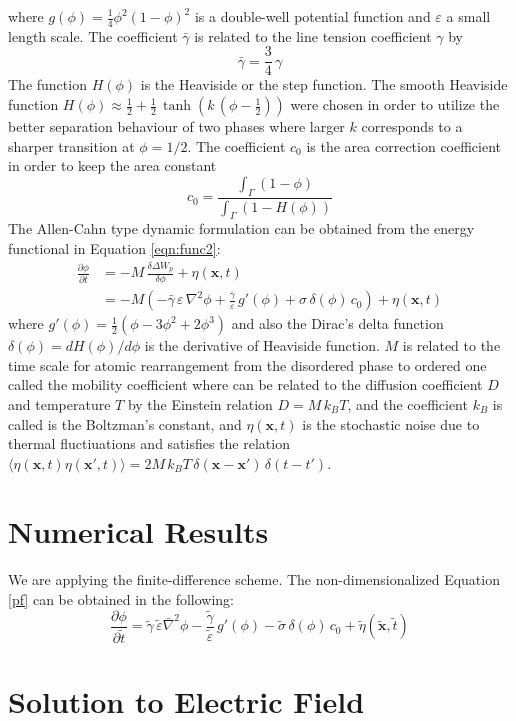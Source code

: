 \documentclass[english,12pt]{article}
\begin{document}
where $g(\phi)=\frac{1}{4}\phi^2(1-\phi)^2$ is a double-well potential function and $\varepsilon$ a small length scale. The coefficient $\bar{\gamma}$ is related to the line tension coefficient $\gamma$ by
\begin{equation}
	\bar{\gamma}=\frac{3}{4}\,\gamma
	\label{eqn:tensioncoeff}
\end{equation}
The function $H(\phi)$ is the Heaviside or the step function. The smooth Heaviside function $H(\phi)\approx\frac{1}{2}+\frac{1}{2}\,\tanh\left(k\,(\phi-\frac{1}{2})\right)$ were chosen in order to utilize the better separation behaviour of two phases where larger $k$ corresponds to a sharper transition at $\phi=1/2$. The coefficient $c_0$ is the area correction coefficient in order to keep the area constant
\begin{equation}
	c_0=\frac{\int_\Gamma(1-\phi)}{\int_{\Gamma}\left(1-H(\phi)\right)}
\end{equation}
The Allen-Cahn type dynamic formulation can be obtained from the energy functional in Equation \ref{eqn:func2}:
\begin{align}
		\frac{\partial\phi}{\partial t}&=-M\,\frac{\delta\Delta W_p}{\delta\phi}+\eta(\mathbf{x},t) \nonumber \\
		&=-M\left(-\bar{\gamma}\,\varepsilon\,\nabla^2\phi+\frac{\bar{\gamma}}{\varepsilon}\,g'(\phi)  + \sigma\,\delta(\phi)\,c_0\right)+\eta(\mathbf{x},t)
		\label{pf}
\end{align}
where $g'(\phi)=\frac{1}{2}\left(\phi-3\phi^2+2\phi^3\right)$ and also the Dirac's delta function $\delta(\phi)=dH(\phi)/d\phi$ is the derivative of Heaviside function. $M$ is related to the time scale for atomic rearrangement from the disordered phase to ordered one called the mobility coefficient where can be related to the diffusion coefficient $D$ and temperature $T$ by the Einstein relation $D=M\,k_B T$, and the coefficient $k_B$ is called is the Boltzman's constant, and $\eta(\mathbf{x},t)$ is the stochastic noise due to thermal fluctiuations and satisfies the relation $\langle\eta(\mathbf{x},t)\eta(\mathbf{x'},t)\rangle=2M\,k_B T\,\delta(\mathbf{x}-\mathbf{x'})\,\delta(t-t')$.
\section{Numerical Results}
We are applying the finite-difference scheme. The non-dimensionalized Equation \ref{pf} can be obtained in the following:
\begin{equation}
	\frac{\partial\phi}{\partial\tilde{t}}=\tilde{\gamma}\,\tilde{\varepsilon}\bar{\nabla}^2\phi-\frac{\tilde{\gamma}}{\tilde{\varepsilon}}
\,g'(\phi)-\tilde{\sigma}\,\delta(\phi)\,c_0+\tilde{\eta}(\mathbf{\tilde{x}},\tilde{t})
\end{equation}


\newpage
\appendix
\section{Solution to Electric Field}

\newpage


\end{document}
